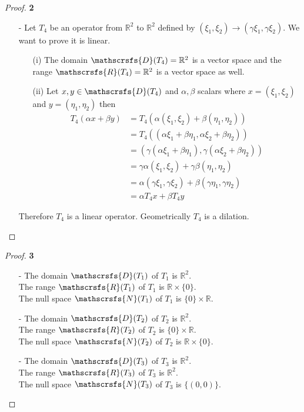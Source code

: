 \documentclass[11pt]{article}
\newcommand{\R}{\mathbb{R}}
\newcommand{\dom}{\mathscrsfs{D}}
\newcommand{\range}{\mathscrsfs{R}}
\newcommand{\nullsp}{\mathscrsfs{N}}
\theoremstyle{definition}
\begin{document}
\begin{proof}{\textbf{2}}
\begin{itemize}
    \item[-]
    Let $T_4$ be an operator from $\R^2$ to $\R^2$ defined by
    $(\xi_1, \xi_2) \to (\gamma\xi_1, \gamma\xi_2)$.
    We want to prove it is linear.
    \begin{itemize}
        \item [(i)] The domain $\mathscrsfs{D}(T_4) = \R^2$ is a vector space
        and the range $\mathscrsfs{R}(T_4) = \R^2$ is a vector space as well.
        \item [(ii)] Let $x,y \in \dom(T_4)$ and $\alpha,\beta$ scalars
        where $x = (\xi_1, \xi_2)$ and $y = (\eta_1, \eta_2)$ then
        \begin{align*}
            T_4(\alpha x + \beta y)
            &= T_4(\alpha(\xi_1, \xi_2) + \beta(\eta_1, \eta_2))\\
            &= T_4((\alpha\xi_1 + \beta\eta_1, \alpha\xi_2 + \beta\eta_2))\\
            &= (\gamma(\alpha\xi_1 + \beta\eta_1), \gamma(\alpha\xi_2 + \beta\eta_2))\\
            &= \gamma\alpha(\xi_1, \xi_2) + \gamma\beta(\eta_1, \eta_2)\\
            &= \alpha(\gamma\xi_1, \gamma\xi_2) + \beta(\gamma\eta_1, \gamma\eta_2)\\
            &= \alpha T_4x + \beta T_4y
        \end{align*}
    \end{itemize}
    Therefore $T_4$ is a linear operator. Geometrically $T_4$ is a dilation.
\end{itemize}
\end{proof}
\cleardoublepage
\begin{proof}{\textbf{3}}
    \begin{itemize}
        \item[-]
        The domain $\dom(T_1)$ of $T_1$ is $\R^2$.\\
        The range $\range(T_1)$ of $T_1$ is $\R \times \{0\}$.\\
        The null space $\nullsp(T_1)$ of $T_1$ is $\{0\} \times \R$.\\

        \item[-]
        The domain $\dom(T_2)$ of $T_2$ is $\R^2$.\\
        The range $\range(T_2)$ of $T_2$ is $\{0\} \times \R$.\\
        The null space $\nullsp(T_2)$ of $T_2$ is $\R \times \{0\}$.\\

        \item[-]
        The domain $\dom(T_3)$ of $T_3$ is $\R^2$.\\
        The range $\range(T_3)$ of $T_3$ is $\R^2$.\\
        The null space $\nullsp(T_3)$ of $T_3$ is $\{(0,0)\}$.
    \end{itemize}
\end{proof}
\end{document}
